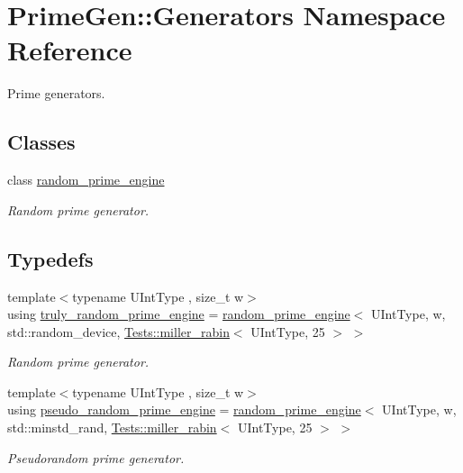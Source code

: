 \hypertarget{namespace_prime_gen_1_1_generators}{\section{Prime\+Gen\+:\+:Generators Namespace Reference}
\label{namespace_prime_gen_1_1_generators}
}


Prime generators.  


\subsection*{Classes}
\begin{DoxyCompactItemize}
\item 
class \hyperlink{class_prime_gen_1_1_generators_1_1random__prime__engine}{random\+\_\+prime\+\_\+engine}
\begin{DoxyCompactList}\small\item\em Random prime generator. \end{DoxyCompactList}\end{DoxyCompactItemize}
\subsection*{Typedefs}
\begin{DoxyCompactItemize}
\item 
{\footnotesize template$<$typename U\+Int\+Type , size\+\_\+t w$>$ }\\using \hyperlink{namespace_prime_gen_1_1_generators_ab2949ed1231e1fe0166367456a32a746}{truly\+\_\+random\+\_\+prime\+\_\+engine} = \hyperlink{class_prime_gen_1_1_generators_1_1random__prime__engine}{random\+\_\+prime\+\_\+engine}$<$ U\+Int\+Type, w, std\+::random\+\_\+device, \hyperlink{namespace_prime_gen_1_1_tests_ab4ab789bde1badebff58de914a31afb3}{Tests\+::miller\+\_\+rabin}$<$ U\+Int\+Type, 25 $>$ $>$
\begin{DoxyCompactList}\small\item\em Random prime generator. \end{DoxyCompactList}\item 
{\footnotesize template$<$typename U\+Int\+Type , size\+\_\+t w$>$ }\\using \hyperlink{namespace_prime_gen_1_1_generators_a376898a01ff7e348018297a4d1147977}{pseudo\+\_\+random\+\_\+prime\+\_\+engine} = \hyperlink{class_prime_gen_1_1_generators_1_1random__prime__engine}{random\+\_\+prime\+\_\+engine}$<$ U\+Int\+Type, w, std\+::minstd\+\_\+rand, \hyperlink{namespace_prime_gen_1_1_tests_ab4ab789bde1badebff58de914a31afb3}{Tests\+::miller\+\_\+rabin}$<$ U\+Int\+Type, 25 $>$ $>$
\begin{DoxyCompactList}\small\item\em Pseudorandom prime generator. \end{DoxyCompactList}\end{DoxyCompactItemize}
